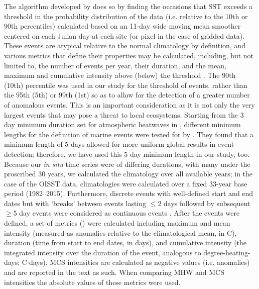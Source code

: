 \documentclass[a4paper,10pt,review]{elsarticle}
\begin{document}
The algorithm developed by \cite{Hobday2016} does so by finding the occasions that SST exceeds a threshold in the probability distribution of the data (i.e. relative to the 10th or 90th percentiles) calculated based on an 11-day wide moving mean smoother centered on each Julian day at each site (or pixel in the case of gridded data). These events are atypical relative to the normal climatology by definition, and various metrics that define their properties may be calculated, including, but not limited to, the number of events per year, their duration, and the mean, maximum and cumulative intensity above (below) the threshold \citep{Hobday2016}. The 90th (10th) percentile was used in our study for the threshold of events, rather than the 95th (5th) or 99th (1st) so as to allow for the detection of a greater number of anomalous events. This is an important consideration as it is not only the very largest events that may pose a threat to local ecosystems. Starting from the 3 day minimum duration set for atmospheric heatwaves in \citet{Perkins2013}, different minimum lengths for the definition of marine events were tested for by \citet{Hobday2016}. They found that a minimum length of 5 days allowed for more uniform global results in event detection; therefore, we have used this 5 day minimum length in our study, too. Because our \emph{in situ} time series were of differing durations, with many under the proscribed 30 years, we calculated the climatology over all available years; in the case of the OISST data, climatologies were calculated over a fixed 33-year base period (1982--2015). Furthermore, discrete events with well-defined start and end dates but with `breaks' between events lasting $\leq$2 days followed by subsequent $\geq$5 day events were considered as continuous events \citep{Hobday2016}. After the events were defined, a set of metrics () were calculated including maximum and mean intensity (measured as anomalies relative to the climatological mean, in \degree C), duration (time from start to end dates, in days), and cumulative intensity (the integrated intensity over the duration of the event, analogous to degree-heating-days; \degree C$\cdot$days). MCS intensities are calculated as negative values (i.e. anomalies) and are reported in the text as such. When comparing MHW and MCS intensities the absolute values of these metrics were used.
\end{document}
